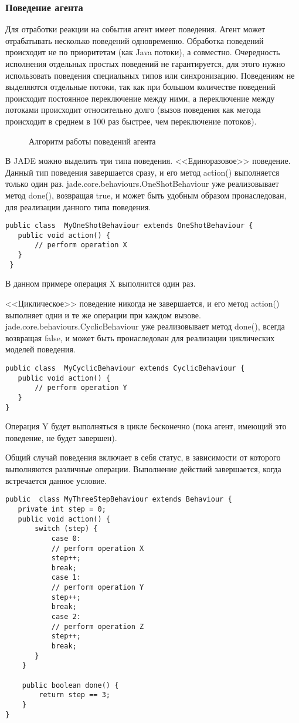 \subsubsection{Поведение агента}
Для отработки реакции на события агент имеет поведения. Агент может отрабатывать несколько поведений одновременно. Обработка поведений происходит не по приоритетам (как Java потоки), а совместно. Очередность исполнения отдельных простых поведений не гарантируется, для этого нужно использовать поведения специальных типов или синхронизацию.
Поведениям не выделяются отдельные потоки, так как при большом количестве поведений происходит постоянное переключение между ними, а переключение между потоками происходит относительно долго (вызов поведения как метода происходит в среднем в 100 раз быстрее, чем переключение потоков).
\begin{figure}[h!]
\caption{Алгоритм работы поведений агента}
\label{2:behs}
\end{figure}
В JADE можно выделить три типа поведения.
<<Единоразовое>> поведение. Данный тип поведения завершается сразу, и его метод action() выполняется только один раз. jade.core.behaviours.OneShotBehaviour уже реализовывает метод done(), возвращая true, и может быть удобным образом пронаследован, для реализации данного типа поведения.
\begin{lstlisting}
public class  MyOneShotBehaviour extends OneShotBehaviour { 
   public void action() { 
       // perform operation X 
   } 
 }
\end{lstlisting}
В данном примере операция X выполнится один раз.

<<Циклическое>> поведение никогда не завершается, и его метод action() выполняет одни и те же операции при каждом вызове. jade.core.behaviours.CyclicBehaviour уже реализовывает метод done(), всегда возвращая false, и может быть пронаследован для реализации циклических моделей поведения.
\begin{lstlisting}
public class  MyCyclicBehaviour extends CyclicBehaviour { 
   public void action() { 
       // perform operation Y 
   } 
}
\end{lstlisting}
Операция Y будет выполняться в цикле бесконечно (пока агент, имеющий это поведение, не будет завершен).

Общий случай поведения включает в себя статус, в зависимости от которого выполняются различные операции. Выполнение действий завершается, когда встречается данное условие.
\begin{lstlisting}
public  class MyThreeStepBehaviour extends Behaviour { 
   private int step = 0; 
   public void action() { 
       switch (step) { 
           case 0: 
           // perform operation X 
           step++; 
           break; 
           case 1: 
           // perform operation Y 
           step++; 
           break; 
           case 2: 
           // perform operation Z 
           step++; 
           break; 
       } 
    } 

    public boolean done() { 
        return step == 3; 
    } 
}
\end{lstlisting}

